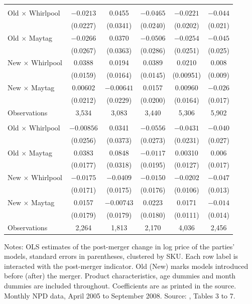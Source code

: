 \begin{table}[htbp]
\begin{tabular}{@{}lccccc@{}}
\addlinespace
\multicolumn{6}{@{}l}{\textit{Refrigerators}} \\
Old $\times$ Whirlpool & $-0.0213$ & 0.0455 & $-0.0465$ & $-0.0221$ & $-0.044$ \\
 & (0.0227) & (0.0341) & (0.0240) & (0.0202) & (0.021) \\
Old $\times$ Maytag & $-0.0266$ & 0.0370 & $-0.0506$ & $-0.0254$ & $-0.045$ \\
 & (0.0267) & (0.0363) & (0.0286) & (0.0251) & (0.025) \\
New $\times$ Whirlpool & 0.0388 & 0.0194 & 0.0389 & 0.0210 & 0.008 \\
 & (0.0159) & (0.0164) & (0.0145) & (0.00951) & (0.009) \\
New $\times$ Maytag & 0.00602 & $-0.00641$ & 0.0157 & 0.00960 & $-0.026$ \\
 & (0.0212) & (0.0229) & (0.0200) & (0.0164) & (0.017) \\
Observations & 3,534 & 3,083 & 3,440 & 5,306 & 5,902 \\
\addlinespace
\multicolumn{6}{@{}l}{\textit{Clothes washers}} \\
Old $\times$ Whirlpool & $-0.00856$ & 0.0341 & $-0.0556$ & $-0.0431$ & $-0.040$ \\
 & (0.0256) & (0.0373) & (0.0273) & (0.0231) & (0.027) \\
Old $\times$ Maytag & 0.0383 & 0.0848 & $-0.0117$ & 0.00310 & 0.006 \\
 & (0.0177) & (0.0318) & (0.0195) & (0.0127) & (0.017) \\
New $\times$ Whirlpool & $-0.0175$ & $-0.0409$ & $-0.0150$ & $-0.0202$ & $-0.047$ \\
 & (0.0171) & (0.0175) & (0.0176) & (0.0106) & (0.013) \\
New $\times$ Maytag & 0.0157 & $-0.00743$ & 0.0223 & 0.0171 & $-0.014$ \\
 & (0.0179) & (0.0179) & (0.0180) & (0.0111) & (0.014) \\
Observations & 2,264 & 1,813 & 2,170 & 4,036 & 2,456 \\
\bottomrule
\end{tabular}

\smallskip
\begin{minipage}{0.97\linewidth}
\footnotesize Notes: OLS estimates of the post-merger change in log price of the parties' models, standard errors
in parentheses, clustered by SKU. Each row label is interacted with the post-merger indicator. Old (New) marks
models introduced before (after) the merger. Product characteristics, age dummies and month dummies are included
throughout. Coefficients are as printed in the source. Monthly NPD data, April 2005 to September 2008. Source:
\citet{AshenfelterHoskenWeinberg2011}, Tables 3 to 7.
\end{minipage}
\end{table}

